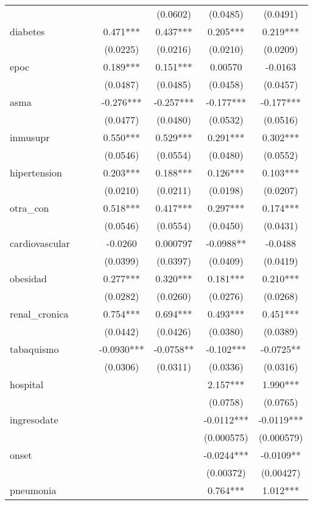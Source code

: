 \documentclass[]{article}
\begin{document}
\begin{tabular}{lcccccc}
 &  &  &  & (0.0602) & (0.0485) & (0.0491) \\
diabetes &  &  & 0.471*** & 0.437*** & 0.205*** & 0.219*** \\
 &  &  & (0.0225) & (0.0216) & (0.0210) & (0.0209) \\
epoc &  &  & 0.189*** & 0.151*** & 0.00570 & -0.0163 \\
 &  &  & (0.0487) & (0.0485) & (0.0458) & (0.0457) \\
asma &  &  & -0.276*** & -0.257*** & -0.177*** & -0.177*** \\
 &  &  & (0.0477) & (0.0480) & (0.0532) & (0.0516) \\
inmusupr &  &  & 0.550*** & 0.529*** & 0.291*** & 0.302*** \\
 &  &  & (0.0546) & (0.0554) & (0.0480) & (0.0552) \\
hipertension &  &  & 0.203*** & 0.188*** & 0.126*** & 0.103*** \\
 &  &  & (0.0210) & (0.0211) & (0.0198) & (0.0207) \\
otra\_con &  &  & 0.518*** & 0.417*** & 0.297*** & 0.174*** \\
 &  &  & (0.0546) & (0.0554) & (0.0450) & (0.0431) \\
cardiovascular &  &  & -0.0260 & 0.000797 & -0.0988** & -0.0488 \\
 &  &  & (0.0399) & (0.0397) & (0.0409) & (0.0419) \\
obesidad &  &  & 0.277*** & 0.320*** & 0.181*** & 0.210*** \\
 &  &  & (0.0282) & (0.0260) & (0.0276) & (0.0268) \\
renal\_cronica &  &  & 0.754*** & 0.694*** & 0.493*** & 0.451*** \\
 &  &  & (0.0442) & (0.0426) & (0.0380) & (0.0389) \\
tabaquismo &  &  & -0.0930*** & -0.0758** & -0.102*** & -0.0725** \\
 &  &  & (0.0306) & (0.0311) & (0.0336) & (0.0316) \\
hospital &  &  &  &  & 2.157*** & 1.990*** \\
 &  &  &  &  & (0.0758) & (0.0765) \\
ingresodate &  &  &  &  & -0.0112*** & -0.0119*** \\
 &  &  &  &  & (0.000575) & (0.000579) \\
onset &  &  &  &  & -0.0244*** & -0.0109** \\
 &  &  &  &  & (0.00372) & (0.00427) \\
pneumonia &  &  &  &  & 0.764*** & 1.012*** \\

\end{tabular}
\end{document}
